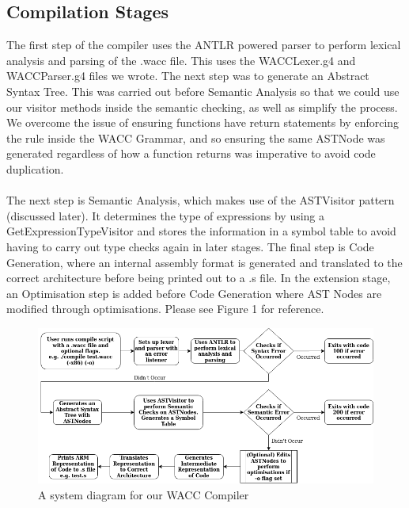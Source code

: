 \documentclass[5pt]{article}
\begin{document}
\subsection{Compilation Stages}
The first step of the compiler uses the ANTLR powered parser to perform lexical analysis and parsing of the .wacc file. This uses the WACCLexer.g4 and WACCParser.g4 files we wrote. The next step was to generate an Abstract Syntax Tree. This was carried out before Semantic Analysis so that we could use our visitor methods inside the semantic checking, as well as simplify the process. We overcome the issue of ensuring functions have return statements by enforcing the rule inside the WACC Grammar, and so ensuring the same ASTNode was generated regardless of how a function returns was imperative to avoid code duplication.
\\ \\
The next step is Semantic Analysis, which makes use of the ASTVisitor pattern (discussed later). It determines the type of expressions by using a GetExpressionTypeVisitor and stores the information in a symbol table to avoid having to carry out type checks again in later stages. The final step is Code Generation, where an internal assembly format is generated and translated to the correct architecture before being printed out to a .s file. In the extension stage, an Optimisation step is added before Code Generation where AST Nodes are modified through optimisations. Please see Figure 1 for reference.
\begin{figure}
    \centering
    \includegraphics[width = 140mm]{SystemDiagram.png}
    \caption{A system diagram for our WACC Compiler}
    \label{fig:System Diagram}
\end{figure}{}
\end{document}
